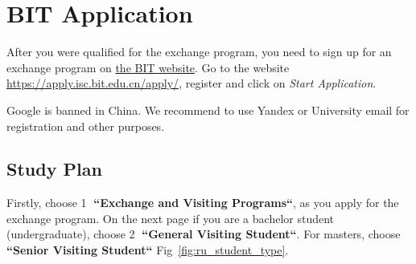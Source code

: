 



\chapter{BIT Application}\label{ch:ru_application}

After you were qualified for the exchange program,
you need to sign up for an exchange program on
\href{https://apply.isc.bit.edu.cn/apply/}{the BIT website}.
Go to the website \url{https://apply.isc.bit.edu.cn/apply/},
register and click on \textit{Start Application}.

\begin{note}
    Google is banned in China.
    We recommend to use Yandex or University email
    for registration and other purposes.
\end{note}







\section{Study Plan}\label{sec:study_plan}

Firstly, choose \textcircled{1} \textbf{``Exchange and Visiting Programs``},
as you apply for the exchange program.
On the next page if you are a bachelor student (undergraduate),
choose \textcircled{2} \textbf{``General Visiting Student``}.
For masters, choose \textbf{``Senior Visiting Student``}
Fig~\ref{fig:ru_student_type}.


